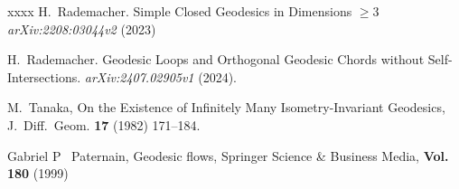 \documentclass{amsart}
\theoremstyle{definition}
\theoremstyle{remark}
\numberwithin{equation}{section}
\begin{document}
\begin{thebibliography}{xxxx}
    H.\ Rademacher.
    {Simple Closed Geodesics in Dimensions $\geq3$}
    \emph{arXiv:2208:03044v2} (2023)

    H.\ Rademacher.
    {Geodesic Loops and Orthogonal Geodesic Chords without Self-Intersections.}
    \emph{arXiv:2407.02905v1} (2024).


    M.\ Tanaka,
    {On the Existence of Infinitely Many Isometry-Invariant Geodesics},
    {J.\ Diff.\ Geom.} \textbf{17} (1982) 171--184.

    Gabriel P \ Paternain,
    {Geodesic flows},
    {Springer Science \& Business Media}, \textbf{Vol. 180} (1999)





\end{thebibliography}
\end{document}
